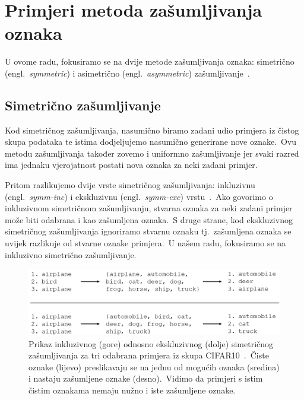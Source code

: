\documentclass[diplomskirad]{fer}
\begin{document}
\section{Primjeri metoda zašumljivanja oznaka}
\label{sek:primjeri_zasumljivanja}

U ovome radu, fokusiramo se na dvije metode zašumljivanja oznaka: simetrično (engl.\ \textit{symmetric}) i asimetrično (engl.\ \textit{asymmetric}) zašumljivanje~\cite{cordeiro2020survey}.\

\subsection{Simetrično zašumljivanje}
\label{sub:sym}

Kod simetričnog zašumljivanja, nasumično biramo zadani udio primjera iz čistog skupa podataka te istima dodjeljujemo nasumično generirane nove oznake.\ 
Ovu metodu zašumljivanja također zovemo i uniformno zašumljivanje jer svaki razred ima jednaku vjerojatnost postati nova oznaka za neki zadani primjer.\ 
  
Pritom razlikujemo dvije vrste simetričnog zašumljivanja: inkluzivnu (engl.\ \textit{symm-inc}) i ekskluzivnu (engl.\ \textit{symm-exc}) vrstu~\cite{cordeiro2020survey}.\ 
Ako govorimo o inkluzivnom simetričnom zašumljivanju, stvarna oznaka za neki zadani primjer može biti odabrana i kao zašumljena oznaka.\ 
S druge strane, kod ekskluzivnog simetričnog zašumljivanja ignoriramo stvarnu oznaku tj.\ zašumljena oznaka se uvijek razlikuje od stvarne oznake primjera.\ 
U našem radu, fokusiramo se na inkluzivno simetrično zašumljivanje.\ 

\pagebreak

\begin{figure}[h]
  \centering
  \includegraphics[scale=0.7]{./Slike/sym.png}
  \caption{Prikaz inkluzivnog (gore) odnosno ekskluzivnog (dolje) simetričnog zašumljivanja za tri odabrana primjera iz skupa CIFAR10~\cite{krizhevsky2009learning}.\ Čiste oznake (lijevo) preslikavaju se na jednu od mogućih oznaka (sredina) i nastaju zašumljene oznake (desno).\ Vidimo da primjeri s istim čistim oznakama nemaju nužno i iste zašumljene oznake.}
  \label{fig:sym}
\end{figure}
\end{document}
